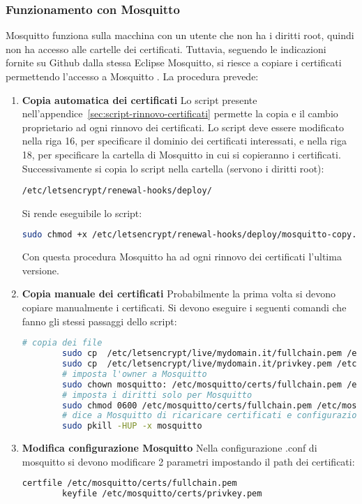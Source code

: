 \subsubsection{Funzionamento con Mosquitto}
Mosquitto funziona sulla macchina con un utente che non ha i diritti root,
quindi non ha accesso alle cartelle dei certificati.
Tuttavia, seguendo le indicazioni fornite su Github dalla stessa Eclipse Mosquitto,
si riesce a copiare i certificati permettendo l'accesso a Mosquitto \cite{mosquitto-ssl-2}.
La procedura prevede:
\begin{enumerate}
    \item \textbf{Copia automatica dei certificati}\newline
    Lo script presente nell'appendice~\ref{sec:script-rinnovo-certificati} permette la copia e il cambio proprietario
    ad ogni rinnovo dei certificati.
    Lo script deve essere modificato nella riga 16, per specificare il dominio dei certificati interessati,
    e nella riga 18, per specificare la cartella di Mosquitto in cui si copieranno i certificati.
    Successivamente si copia lo script nella cartella (servono i diritti root):
    \begin{lstlisting}[language=textnonum]
    /etc/letsencrypt/renewal-hooks/deploy/
    \end{lstlisting}
    Si rende eseguibile lo script:
    \begin{lstlisting}[language=bash]
        sudo chmod +x /etc/letsencrypt/renewal-hooks/deploy/mosquitto-copy.sh
    \end{lstlisting}
    Con questa procedura Mosquitto ha ad ogni rinnovo dei certificati l'ultima versione.
    \item \textbf{Copia manuale dei certificati}\newline
    Probabilmente la prima volta si devono copiare manualmente i certificati.
    Si devono eseguire i seguenti comandi che fanno gli stessi passaggi dello script:
    \begin{lstlisting}[language=bash]
        # copia dei file
        sudo cp  /etc/letsencrypt/live/mydomain.it/fullchain.pem /etc/mosquitto/certs/fullchain.pem
        sudo cp  /etc/letsencrypt/live/mydomain.it/privkey.pem /etc/mosquitto/certs/privkey.pem
        # imposta l'owner a Mosquitto
        sudo chown mosquitto: /etc/mosquitto/certs/fullchain.pem /etc/mosquitto/certs/privkey.pem
        # imposta i diritti solo per Mosquitto
        sudo chmod 0600 /etc/mosquitto/certs/fullchain.pem /etc/mosquitto/certs/privkey.pem
        # dice a Mosquitto di ricaricare certificati e configurazione
        sudo pkill -HUP -x mosquitto
    \end{lstlisting}
    \item \textbf{Modifica configurazione Mosquitto}\newline
    Nella configurazione .conf di mosquitto si devono modificare 2 parametri impostando il path dei certificati:
    \begin{lstlisting}[language=bash]
        certfile /etc/mosquitto/certs/fullchain.pem
        keyfile /etc/mosquitto/certs/privkey.pem
    \end{lstlisting}
\end{enumerate}
